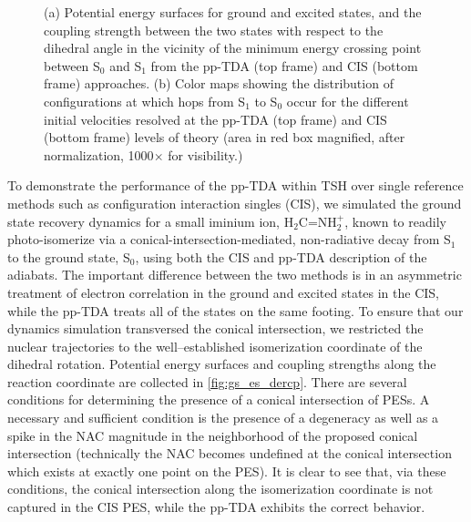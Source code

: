 \begin{figure}[h!]
\begin{subfigure}[b]{0.40\textwidth}
  \caption{ }
  \label{fig:hops}
  \end{subfigure}
  \caption{\footnotesize (a) Potential energy surfaces for ground and excited
  states, and the coupling strength between the two states with respect to the
  dihedral angle in the vicinity of the minimum energy crossing point between
  S$_0$ and S$_1$ from the pp-TDA (top frame) and CIS (bottom frame) approaches.
  (b) Color maps showing the distribution of configurations at which hops from
  S$_1$ to S$_0$ occur for the different initial velocities resolved at the
  pp-TDA (top frame) and CIS (bottom frame) levels of theory (area in red box
  magnified, after normalization, 1000$\times$ for visibility.)}
\end{figure}

To demonstrate the performance of the pp-TDA within TSH over single reference
methods such as configuration interaction singles (CIS), we simulated the ground
state recovery dynamics for a small iminium ion, H$_2$C=NH$_2^+$, known to
readily photo-isomerize via a conical-intersection-mediated, non-radiative decay
from S$_1$ to the ground state, S$_0$, using both the CIS and pp-TDA description
of the adiabats. The important difference between the two methods is in an
asymmetric treatment of electron correlation in the ground and excited states in
the CIS, while the pp-TDA treats all of the states on the same footing. To
ensure that our dynamics simulation transversed the conical intersection, we
restricted the nuclear trajectories to the well--established isomerization
coordinate of the dihedral rotation.  Potential energy surfaces and coupling
strengths along the reaction coordinate are collected in \cref{fig:gs_es_dercp}. 
There are several conditions for determining the presence of a conical
intersection of PESs. A necessary and sufficient condition is the presence of a
degeneracy as well as a spike in the NAC magnitude in the neighborhood of the
proposed conical intersection (technically the NAC becomes undefined at the
conical intersection which exists at exactly one point on the PES).
It is clear to see that, via these conditions, the conical intersection along
the isomerization coordinate is not captured in the CIS PES, while the pp-TDA
exhibits the correct behavior.

